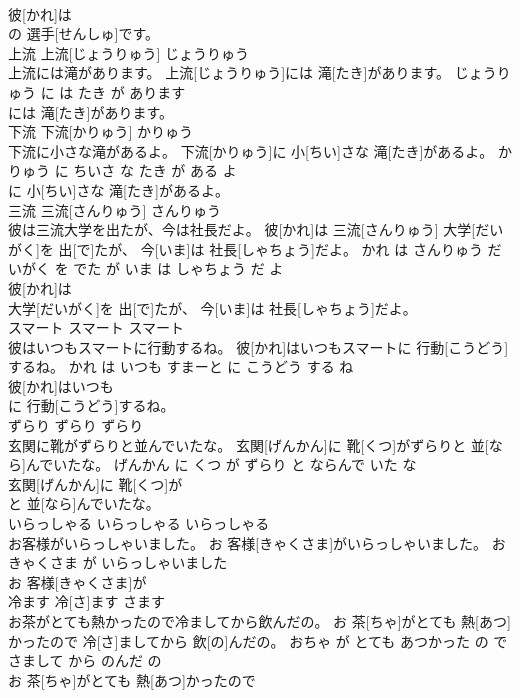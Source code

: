 \documentclass[8pt]{extreport}
\begin{document}
\begin{CJK}{UTF8}{min}
\\	彼[かれ]は
\\	の 選手[せんしゅ]です。			
\\	上流	上流[じょうりゅう]	じょうりゅう	
\\	上流には滝があります。	上流[じょうりゅう]には 滝[たき]があります。	じょうりゅう に は たき が あります	
\\	には 滝[たき]があります。			
\\	下流	下流[かりゅう]	かりゅう	
\\	下流に小さな滝があるよ。	下流[かりゅう]に 小[ちい]さな 滝[たき]があるよ。	かりゅう に ちいさ な たき が ある よ	
\\	に 小[ちい]さな 滝[たき]があるよ。			
\\	三流	三流[さんりゅう]	さんりゅう	
\\	彼は三流大学を出たが、今は社長だよ。	彼[かれ]は 三流[さんりゅう] 大学[だいがく]を 出[で]たが、 今[いま]は 社長[しゃちょう]だよ。	かれ は さんりゅう だいがく を でた が いま は しゃちょう だ よ	
\\	彼[かれ]は
\\	大学[だいがく]を 出[で]たが、 今[いま]は 社長[しゃちょう]だよ。			
\\	スマート	スマート	スマート	
\\	彼はいつもスマートに行動するね。	彼[かれ]はいつもスマートに 行動[こうどう]するね。	かれ は いつも すまーと に こうどう する ね	
\\	彼[かれ]はいつも
\\	に 行動[こうどう]するね。			
\\	ずらり	ずらり	ずらり	
\\	玄関に靴がずらりと並んでいたな。	玄関[げんかん]に 靴[くつ]がずらりと 並[なら]んでいたな。	げんかん に くつ が ずらり と ならんで いた な	
\\	玄関[げんかん]に 靴[くつ]が
\\	と 並[なら]んでいたな。			
\\	いらっしゃる	いらっしゃる	いらっしゃる	
\\	お客様がいらっしゃいました。	お 客様[きゃくさま]がいらっしゃいました。	おきゃくさま が いらっしゃいました	
\\	お 客様[きゃくさま]が
\\	冷ます	冷[さ]ます	さます	
\\	お茶がとても熱かったので冷ましてから飲んだの。	お 茶[ちゃ]がとても 熱[あつ]かったので 冷[さ]ましてから 飲[の]んだの。	おちゃ が とても あつかった の で さまして から のんだ の	
\\	お 茶[ちゃ]がとても 熱[あつ]かったので

\end{CJK}
\end{document}
